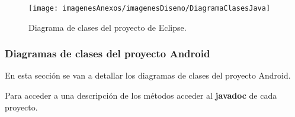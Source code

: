 \begin{figure}[h]
    \begin{center}%
        \begin{center}%
          \texttt{[image: imagenesAnexos/imagenesDiseno/DiagramaClasesJava]}%
          \caption{Diagrama de clases del proyecto de Eclipse.}%
          \label{figDiagramaClasesJava}%
        \end{center}%
  	\end{center}%
\end{figure}%

\newpage
\subsubsection{Diagramas de clases del proyecto Android}

En esta sección se van a detallar los diagramas de clases del proyecto Android.

Para acceder a una descripción de los métodos acceder al \textbf{javadoc} de cada proyecto.

